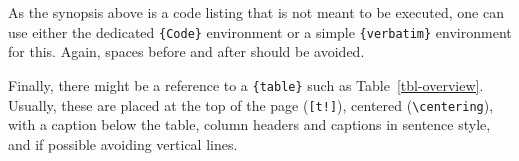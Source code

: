 \documentclass[
  article]{jss}
\begin{document}
\begin{tcolorbox}[enhanced jigsaw, bottomrule=.15mm, colback=white, left=2mm, breakable, toprule=.15mm, opacityback=0, arc=.35mm, colframe=quarto-callout-color-frame, rightrule=.15mm, leftrule=.75mm]

As the synopsis above is a code listing that is not meant to be
executed, one can use either the dedicated \texttt{\{Code\}} environment
or a simple \texttt{\{verbatim\}} environment for this. Again, spaces
before and after should be avoided.

Finally, there might be a reference to a \texttt{\{table\}} such as
Table~\ref{tbl-overview}. Usually, these are placed at the top of the
page (\texttt{{[}t!{]}}), centered (\texttt{\textbackslash{}centering}),
with a caption below the table, column headers and captions in sentence
style, and if possible avoiding vertical lines.

\end{tcolorbox}
\end{document}
